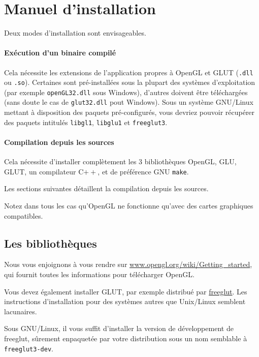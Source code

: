 \documentclass[a4paper, oneside, 11pt, twocolumn]{article}
\begin{document}
\clearpage
\appendix

\section{Manuel d'installation}

Deux modes d'installation sont envisageables.

\paragraph{Exécution d'un binaire compilé} Cela nécessite les extensions de l'application propres à OpenGL et GLUT (\texttt{.dll} ou \texttt{.so}). Certaines sont pré-installées sous la plupart des systèmes d'exploitation (par exemple \texttt{openGL32.dll} sous Windows), d'autres doivent être téléchargées (sans doute le cas de \texttt{glut32.dll} pout Windows). Sous un système GNU/Linux mettant à disposition des paquets pré-configurés, vous devriez pouvoir récupérer des paquets intitulés \texttt{libgl1}, \texttt{libglu1} et \texttt{freeglut3}.

\paragraph{Compilation depuis les sources} Cela nécessite d'installer complètement les 3 bibliothèques OpenGL, GLU, GLUT, un compilateur C$++$, et de préférence GNU \texttt{make}.

Les sections suivantes détaillent la compilation depuis les sources.

Notez dans tous les cas qu'OpenGL ne fonctionne qu'avec des cartes graphiques compatibles.

\subsection{Les bibliothèques}

Nous vous enjoignons à vous rendre sur \href{https://www.opengl.org/wiki/Getting_started}{www.opengl.org/wiki/Getting\_started}, qui fournit toutes les informations pour télécharger OpenGL.

Vous devez également installer GLUT, par exemple distribué par \href{http://freeglut.sourceforge.net/docs/install.php}{freeglut}. Les instructions d'installation pour des systèmes autres que Unix/Linux semblent lacunaires.

Sous GNU/Linux, il vous suffit d'installer la version de développement de freeglut, sûrement enpaquetée par votre distribution sous un nom semblable à \texttt{freeglut3-dev}.
\end{document}
